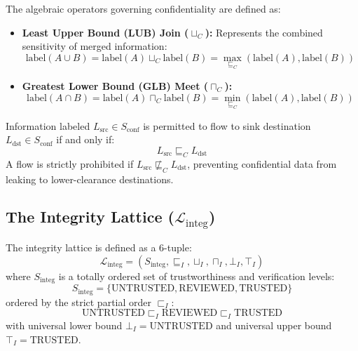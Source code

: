 The algebraic operators governing confidentiality are defined as:
\begin{itemize}
    \item \textbf{Least Upper Bound (LUB) Join ($\sqcup_C$):} Represents the combined sensitivity of merged information:
    \begin{equation}
    \text{label}(A \cup B) = \text{label}(A) \sqcup_C \text{label}(B) = \max_{\sqsubseteq_C}(\text{label}(A), \text{label}(B))
    \end{equation}
    \item \textbf{Greatest Lower Bound (GLB) Meet ($\sqcap_C$):}
    \begin{equation}
    \text{label}(A \cap B) = \text{label}(A) \sqcap_C \text{label}(B) = \min_{\sqsubseteq_C}(\text{label}(A), \text{label}(B))
    \end{equation}
\end{itemize}

\begin{axiom}
Information labeled $L_{\text{src}} \in S_{\text{conf}}$ is permitted to flow to sink destination $L_{\text{dst}} \in S_{\text{conf}}$ if and only if:
\begin{equation}
L_{\text{src}} \sqsubseteq_C L_{\text{dst}}
\end{equation}
A flow is strictly prohibited if $L_{\text{src}} \not\sqsubseteq_C L_{\text{dst}}$, preventing confidential data from leaking to lower-clearance destinations.
\end{axiom}

\subsection{The Integrity Lattice ($\mathcal{L}_{\text{integ}}$)}
\begin{definition}
The integrity lattice is defined as a 6-tuple:
\begin{equation}
\mathcal{L}_{\text{integ}} = (S_{\text{integ}}, \sqsubseteq_I, \sqcup_I, \sqcap_I, \bot_I, \top_I)
\end{equation}
where $S_{\text{integ}}$ is a totally ordered set of trustworthiness and verification levels:
\begin{equation}
S_{\text{integ}} = \{\text{UNTRUSTED}, \text{REVIEWED}, \text{TRUSTED}\}
\end{equation}
ordered by the strict partial order $\sqsubset_I$:
\begin{equation}
\text{UNTRUSTED} \sqsubset_I \text{REVIEWED} \sqsubset_I \text{TRUSTED}
\end{equation}
with universal lower bound $\bot_I = \text{UNTRUSTED}$ and universal upper bound $\top_I = \text{TRUSTED}$.
\end{definition}


